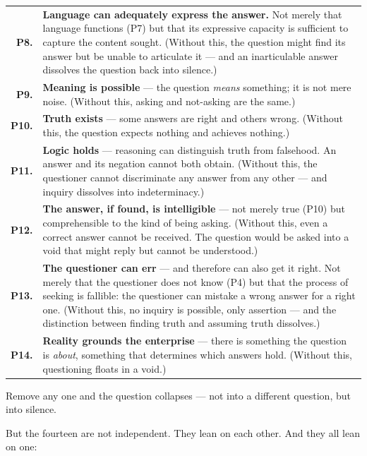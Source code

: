 \documentclass[10pt, openany, oneside]{book}
\renewcommand{\footnotesize}{\fontsize{8.5}{11}\selectfont}
\begin{document}
{\footnotesize
\noindent\begin{tabular}{r p{}}
\textbf{P8.} & \textbf{Language can adequately express the answer.} Not merely that language functions (P7) but that its expressive capacity is sufficient to capture the content sought. (Without this, the question might find its answer but be unable to articulate it --- and an inarticulable answer dissolves the question back into silence.) \\[0.3em]
\textbf{P9.} & \textbf{Meaning is possible} --- the question \textit{means} something; it is not mere noise. (Without this, asking and not-asking are the same.) \\[0.3em]
\textbf{P10.} & \textbf{Truth exists} --- some answers are right and others wrong. (Without this, the question expects nothing and achieves nothing.) \\[0.3em]
\textbf{P11.} & \textbf{Logic holds} --- reasoning can distinguish truth from falsehood. An answer and its negation cannot both obtain. (Without this, the questioner cannot discriminate any answer from any other --- and inquiry dissolves into indeterminacy.) \\[0.3em]
\textbf{P12.} & \textbf{The answer, if found, is intelligible} --- not merely true (P10) but comprehensible to the kind of being asking. (Without this, even a correct answer cannot be received. The question would be asked into a void that might reply but cannot be understood.) \\[0.3em]
\textbf{P13.} & \textbf{The questioner can err} --- and therefore can also get it right. Not merely that the questioner does not know (P4) but that the process of seeking is fallible: the questioner can mistake a wrong answer for a right one. (Without this, no inquiry is possible, only assertion --- and the distinction between finding truth and assuming truth dissolves.) \\[0.3em]
\textbf{P14.} & \textbf{Reality grounds the enterprise} --- there is something the question is \textit{about}, something that determines which answers hold. (Without this, questioning floats in a void.) \\[0.3em]
\end{tabular}
}

\vspace{0.8em}

\noindent Remove any one and the question collapses --- not into a different question, but into silence.

But the fourteen are not independent. They lean on each other. And they all lean on one:
\end{document}
